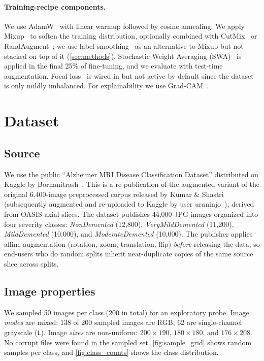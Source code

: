 \documentclass[journal,onecolumn,11pt]{IEEEtran}
\begin{document}
\paragraph{Training-recipe components.}
We use AdamW~\cite{loshchilov2019adamw} with linear warmup followed by
cosine annealing. We apply Mixup~\cite{zhang2018mixup} to soften the
training distribution, optionally combined with CutMix~\cite{yun2019cutmix}
or RandAugment~\cite{cubuk2020randaugment}; we use label
smoothing~\cite{szegedy2016inceptionv3} as an alternative to Mixup but
not stacked on top of it (\cref{sec:methods}). Stochastic Weight Averaging
(SWA)~\cite{izmailov2018swa} is applied in the final 25\% of fine-tuning,
and we evaluate with test-time augmentation. Focal loss~\cite{lin2017focal}
is wired in but not active by default since the dataset is only
mildly imbalanced. For explainability we use Grad-CAM~\cite{selvaraju2017gradcam}.

\section{Dataset}
\label{sec:dataset}

\subsection{Source}
We use the public ``Alzheimer MRI Disease Classification Dataset''
distributed on Kaggle by Borhanitrash~\cite{borhanitrash2023alzheimermri}.
This is a re-publication of the augmented variant of the original
6{,}400-image preprocessed corpus released by Kumar \&
Shastri~\cite{kumar2022alzheimermri} (subsequently augmented and
re-uploaded to Kaggle by user uraninjo~\cite{uraninjo2022augmentedalzheimer}),
derived from OASIS axial slices. The dataset publishes 44{,}000 JPG images organized
into four severity classes:
\textit{NonDemented} (12{,}800), \textit{VeryMildDemented} (11{,}200),
\textit{MildDemented} (10{,}000), and \textit{ModerateDemented} (10{,}000).
The publisher applies affine augmentation (rotation, zoom, translation, flip)
\emph{before} releasing the data, so end-users who do random splits inherit
near-duplicate copies of the same source slice across splits.

\subsection{Image properties}
We sampled 50 images per class (200 in total) for an exploratory probe.
Image \emph{modes} are mixed: 138 of 200 sampled images are RGB, 62 are
single-channel grayscale (\verb|L|). Image \emph{sizes} are non-uniform:
$200{\times}190$, $180{\times}180$, and $176{\times}208$. No corrupt files
were found in the sampled set. \cref{fig:sample_grid} shows random samples
per class, and \cref{fig:class_counts} shows the class distribution.
\end{document}

